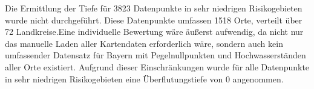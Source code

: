 Die Ermittlung der Tiefe für 3823 Datenpunkte in sehr niedrigen Risikogebieten wurde nicht durchgeführt. Diese Datenpunkte umfassen 1518 Orte, verteilt über 72 Landkreise.Eine individuelle Bewertung wäre äußerst aufwendig, da nicht nur das manuelle Laden aller Kartendaten erforderlich wäre, sondern auch kein umfassender Datensatz für Bayern mit Pegelnullpunkten und Hochwasserständen aller Orte existiert. Aufgrund dieser Einschränkungen wurde für alle Datenpunkte in sehr niedrigen Risikogebieten eine Überflutungstiefe von 0 angenommen.